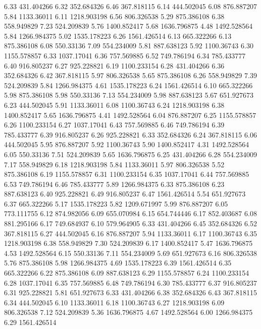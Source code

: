 6.33 	431.404266
6.32 	352.684326
6.46 	367.818115
6.14 	444.502045
6.08 	876.887207
5.84 	1133.36011
6.11 	1218.903198
6.56 	806.326538
5.29 	875.386108
6.38 	558.949829
7.23 	524.209839
5.76 	1400.852417
5.68 	1636.796875
4.48 	1492.528564
5.84 	1266.984375
5.02 	1535.178223
6.26 	1561.426514
6.13 	665.322266
6.13 	875.386108
6.08 	550.33136
7.09 	554.234009
5.81 	887.638123
5.92 	1100.36743
6.30 	1155.578857
6.33 	1037.17041
6.36 	757.569885
6.52 	749.786194
6.34 	785.433777
6.40 	916.805237
6.27 	925.228821
6.19 	1100.233154
6.28 	431.404266
6.36 	352.684326
6.42 	367.818115
5.97 	806.326538
5.65 	875.386108
6.26 	558.949829
7.39 	524.209839
5.84 	1266.984375
4.61 	1535.178223
6.24 	1561.426514
6.10 	665.322266
5.98 	875.386108
5.98 	550.33136
7.13 	554.234009
5.98 	887.638123
5.67 	651.927673
6.23 	444.502045
5.91 	1133.36011
6.08 	1100.36743
6.24 	1218.903198
6.38 	1400.852417
5.65 	1636.796875
4.41 	1492.528564
6.04 	876.887207
6.25 	1155.578857
6.26 	1100.233154
6.27 	1037.17041
6.43 	757.569885
6.46 	749.786194
6.39 	785.433777
6.39 	916.805237
6.26 	925.228821
6.33 	352.684326
6.24 	367.818115
6.06 	444.502045
5.95 	876.887207
5.92 	1100.36743
5.90 	1400.852417
4.31 	1492.528564
6.05 	550.33136
7.51 	524.209839
5.65 	1636.796875
6.25 	431.404266
6.28 	554.234009
7.17 	558.949829
6.18 	1218.903198
5.84 	1133.36011
5.97 	806.326538
5.52 	875.386108
6.19 	1155.578857
6.31 	1100.233154
6.35 	1037.17041
6.44 	757.569885
6.53 	749.786194
6.46 	785.433777
5.89 	1266.984375
6.33 	875.386108
6.23 	887.638123
6.40 	925.228821
6.49 	916.805237
6.47 	1561.426514
5.54 	651.927673
6.37 	665.322266
5.17 	1535.178223
5.82 	1209.671997
5.99 	876.887207
6.05 	773.111755
6.12 	874.982056
6.09 	655.070984
6.15 	654.744446
6.17 	852.403687
6.08 	881.295166
6.17 	749.684937
6.10 	579.964905
6.33 	431.404266
6.45 	352.684326
6.52 	367.818115
6.27 	444.502045
6.16 	876.887207
5.94 	1133.36011
6.17 	1100.36743
6.35 	1218.903198
6.38 	558.949829
7.30 	524.209839
6.17 	1400.852417
5.47 	1636.796875
4.53 	1492.528564
6.15 	550.33136
7.11 	554.234009
5.69 	651.927673
6.16 	806.326538
5.76 	875.386108
5.98 	1266.984375
4.69 	1535.178223
6.39 	1561.426514
6.35 	665.322266
6.22 	875.386108
6.09 	887.638123
6.29 	1155.578857
6.24 	1100.233154
6.28 	1037.17041
6.35 	757.569885
6.48 	749.786194
6.30 	785.433777
6.37 	916.805237
6.31 	925.228821
5.81 	651.927673
6.33 	431.404266
6.38 	352.684326
6.43 	367.818115
6.34 	444.502045
6.10 	1133.36011
6.18 	1100.36743
6.27 	1218.903198
6.09 	806.326538
7.12 	524.209839
5.36 	1636.796875
4.67 	1492.528564
6.00 	1266.984375
6.29 	1561.426514
